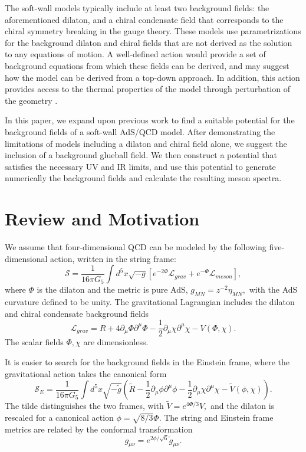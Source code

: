 \documentclass[12pt]{article}
\newcommand{\be}{\begin{equation}}
\newcommand{\ee}{\end{equation}}
\def\thalf{{\textstyle{\frac{1}{2}}}}
\newcommand{\cL}{\mathcal L}
\newcommand{\cS}{\mathcal S}
\begin{document}
The soft-wall models typically include at least two background fields: the aforementioned dilaton, and a chiral condensate field that corresponds to the chiral symmetry breaking in the gauge theory.
These models use parametrizations for the background dilaton and chiral fields that are not derived as the solution to any equations of motion. 
A well-defined action would provide a set of background equations from which these fields can be derived, and may suggest how the model can be derived from a top-down approach. 
In addition, this action provides access to the thermal properties of the model through perturbation of the geometry \cite{Herzog2007, Bayona2008, Gursoy2008b}.

In this paper, we expand upon previous work to find a suitable potential for the background fields of a soft-wall AdS/QCD model. 
After demonstrating the limitations of models including a dilaton and chiral field alone, we suggest the inclusion of a background glueball field. 
We then construct a potential that satisfies the necessary UV and IR limits, and use this potential to generate numerically the background fields and calculate the resulting meson spectra.


\section{Review and Motivation}\label{secReview}

We assume that four-dimensional QCD can be modeled by the following five-dimensional action, written in the string frame:
\be
\cS =\frac{1}{16\pi G_5} \int d^5x \sqrt{-g} \left[ e^{-2\Phi} \cL_{grav} + e^{-\Phi} \cL_{meson} \right], 
\label{eqStringAction}
\ee
where $\Phi$ is the dilaton and the metric is pure AdS, $g_{MN}=z^{-2}\eta_{MN},$ with the AdS curvature defined to be unity.
The gravitational Lagrangian includes the dilaton and chiral condensate background fields
\be
\cL_{grav}=R+4\partial_\mu\Phi\partial^\mu\Phi - \thalf\partial_\mu\chi\partial^\mu\chi -V(\Phi,\chi).
\ee
The scalar fields $\Phi,\chi$ are dimensionless. 

It is easier to search for the background fields in the Einstein frame, where the gravitational action takes the canonical form
\be
\cS_E=\frac{1}{16\pi G_5} \int d^5x \sqrt{-\tilde{g}}\left(\tilde{R}-\thalf\partial_\mu\phi\partial^\mu\phi -\thalf\partial_\mu\chi\partial^\mu\chi - \tilde{V}(\phi,\chi)\right).
\ee
The tilde distinguishes the two frames, with $\tilde{V}=e^{4\Phi/3}V,$ and the dilaton is rescaled for a canonical action $\phi=\sqrt{8/3}\Phi$.
The string and Einstein frame metrics are related by the conformal transformation
\be
g_{\mu\nu}=e^{2\phi/\sqrt{6}}\tilde{g}_{\mu\nu}.
\ee
\end{document}
